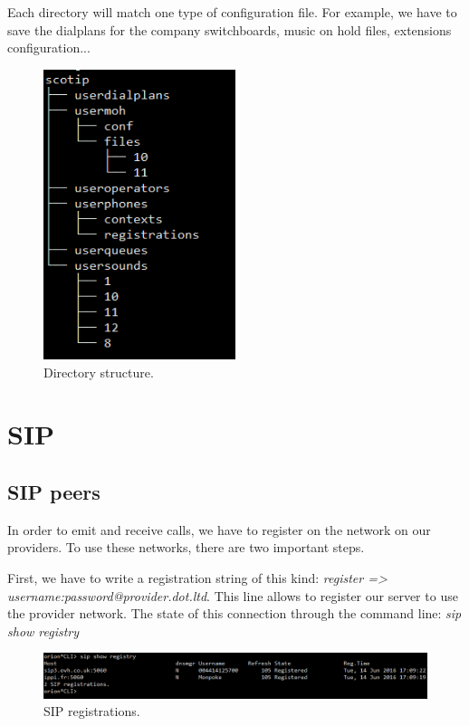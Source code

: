 Each directory will match one type of configuration file. For example, we have to save the dialplans for the company switchboards, music on hold files, extensions configuration... 

\begin{figure}[!ht]
  \caption{Directory structure.}
  \centering
    \includegraphics[width=0.5\textwidth]{img/files_struct_conf.png}
\end{figure}


\section{SIP}

\subsection{SIP peers}
In order to emit and receive calls, we have to register on the network on our providers. To use these networks, there are two important steps. 


First, we have to write a registration string of this kind: \textit{register => username:password@provider.dot.ltd}. This line allows to register our server to use the provider network. The state of this connection through the command line: \textit{sip show registry}

\begin{figure}[!ht]
  \caption{SIP registrations.}
  \centering
    \includegraphics[width=1\textwidth]{img/sipshowregistry.png}
\end{figure}




